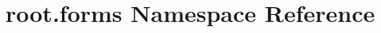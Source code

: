 \hypertarget{namespaceroot_1_1forms}{\section{root.\-forms Namespace Reference}
\label{namespaceroot_1_1forms}
}
